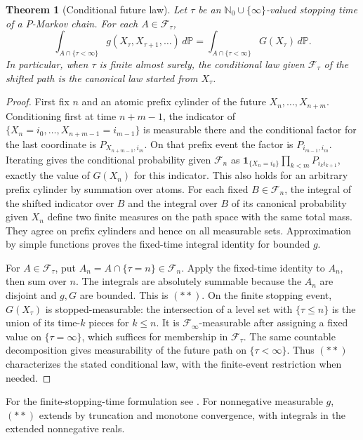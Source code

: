 \documentclass[11pt,oneside,openany]{book}
\theoremstyle{plain}
\newtheorem{theorem}{Theorem}[chapter]
\theoremstyle{definition}
\theoremstyle{remark}
\begin{document}
\begin{theorem}[Conditional future law]
Let \(\tau\) be an \(\mathbb N_0\cup\{\infty\}\)-valued stopping time of a
\(P\)-Markov chain. For each \(A\in\mathcal F_\tau\),
\[
 \int_{A\cap\{\tau<\infty\}}g(X_\tau,X_{\tau+1},\ldots)\,d\mathbb P
 =
 \int_{A\cap\{\tau<\infty\}}G(X_\tau)\,d\mathbb P.
 \tag{**}
\]
In particular, when \(\tau\) is finite almost surely, the conditional
law given \(\mathcal F_\tau\) of the shifted path is the canonical law
started from \(X_\tau\).
\end{theorem}
\begin{proof}
First fix \(n\) and an atomic prefix cylinder of the future
\(X_n,\ldots,X_{n+m}\). Conditioning first at time \(n+m-1\),
the indicator of \(\{X_n=i_0,\ldots,X_{n+m-1}=i_{m-1}\}\)
is measurable there and the conditional factor for the last
coordinate is \(P_{X_{n+m-1},i_m}\). On that prefix event the
factor is \(P_{i_{m-1},i_m}\).
Iterating gives the conditional probability given \(\mathcal F_n\)
as \(\mathbf{1}_{\{X_n=i_0\}}\prod_{k<m}P_{i_ki_{k+1}}\),
exactly the value of \(G(X_n)\) for this indicator. This also
holds for an arbitrary prefix cylinder by summation over atoms.
For each fixed \(B\in\mathcal F_n\), the integral of the shifted
indicator over \(B\) and the integral over \(B\) of its canonical
probability given \(X_n\) define two finite measures on the path
space with the same total mass. They agree on prefix cylinders
and hence on all measurable sets. Approximation by simple
functions proves the fixed-time integral identity for bounded \(g\).

For \(A\in\mathcal F_\tau\), put \(A_n=A\cap\{\tau=n\}\in\mathcal F_n\).
Apply the fixed-time identity to \(A_n\), then sum over \(n\).
The integrals are absolutely summable because the \(A_n\) are
disjoint and \(g,G\) are bounded. This is \((**)\).
On the finite stopping event, \(G(X_\tau)\) is stopped-measurable:
the intersection of a level set with \(\{\tau\le n\}\) is the
union of its time-\(k\) pieces for \(k\le n\).
It is \(\mathcal F_\infty\)-measurable after assigning a fixed value
on \(\{\tau=\infty\}\), which suffices for membership in
\(\mathcal F_\tau\). The same countable decomposition gives
measurability of the future path on \(\{\tau<\infty\}\).
Thus \((**)\) characterizes the stated conditional law, with the
finite-event restriction when needed.
\end{proof}

For the finite-stopping-time formulation see
\cite[Theorem 1.4.2 and Section 6.5]{Norris}.
For nonnegative measurable \(g\), \((**)\) extends by truncation and
monotone convergence, with integrals in the extended nonnegative reals.
\end{document}

